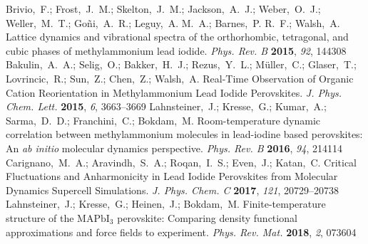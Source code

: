 \documentclass[journal=jpccck,manuscript=article,layout=twocolumn]{achemso}
\begin{document}
\begin{mcitethebibliography}{62}
Brivio,~F.; Frost,~J.~M.; Skelton,~J.~M.; Jackson,~A.~J.; Weber,~O.~J.;
  Weller,~M.~T.; Go\~ni,~A.~R.; Leguy,~A. M.~A.; Barnes,~P. R.~F.; Walsh,~A.
  Lattice dynamics and vibrational spectra of the orthorhombic, tetragonal, and
  cubic phases of methylammonium lead iodide. \emph{Phys. Rev. B}
  \textbf{2015}, \emph{92}, 144308\relax
\mciteBstWouldAddEndPuncttrue
\mciteSetBstMidEndSepPunct{\mcitedefaultmidpunct}
{\mcitedefaultendpunct}{\mcitedefaultseppunct}\relax
\EndOfBibitem
{}
Bakulin,~A.~A.; Selig,~O.; Bakker,~H.~J.; Rezus,~Y.~L.; Müller,~C.;
  Glaser,~T.; Lovrincic,~R.; Sun,~Z.; Chen,~Z.; Walsh,~A. 
  Real-Time Observation of Organic Cation Reorientation in Methylammonium Lead
  Iodide Perovskites. \emph{J. Phys. Chem. Lett.} \textbf{2015}, \emph{6},
  3663--3669\relax
\mciteBstWouldAddEndPuncttrue
\mciteSetBstMidEndSepPunct{\mcitedefaultmidpunct}
{\mcitedefaultendpunct}{\mcitedefaultseppunct}\relax
\EndOfBibitem
{}
Lahnsteiner,~J.; Kresse,~G.; Kumar,~A.; Sarma,~D.~D.; Franchini,~C.; Bokdam,~M.
  Room-temperature dynamic correlation between methylammonium molecules in
  lead-iodine based perovskites: An \textit{ab initio} molecular dynamics
  perspective. \emph{Phys. Rev. B} \textbf{2016}, \emph{94}, 214114\relax
\mciteBstWouldAddEndPuncttrue
\mciteSetBstMidEndSepPunct{\mcitedefaultmidpunct}
{\mcitedefaultendpunct}{\mcitedefaultseppunct}\relax
\EndOfBibitem
{}
Carignano,~M.~A.; Aravindh,~S.~A.; Roqan,~I.~S.; Even,~J.; Katan,~C. Critical
  Fluctuations and Anharmonicity in Lead Iodide Perovskites from Molecular
  Dynamics Supercell Simulations. \emph{J. Phys. Chem. C} \textbf{2017},
  \emph{121}, 20729--20738\relax
\mciteBstWouldAddEndPuncttrue
\mciteSetBstMidEndSepPunct{\mcitedefaultmidpunct}
{\mcitedefaultendpunct}{\mcitedefaultseppunct}\relax
\EndOfBibitem
{}
Lahnsteiner,~J.; Kresse,~G.; Heinen,~J.; Bokdam,~M. Finite-temperature
  structure of the ${\mathrm{MAPbI}}_{3}$ perovskite: Comparing density
  functional approximations and force fields to experiment. \emph{Phys. Rev.
  Mat.} \textbf{2018}, \emph{2}, 073604\relax
\mciteBstWouldAddEndPuncttrue
\mciteSetBstMidEndSepPunct{\mcitedefaultmidpunct}

\end{mcitethebibliography}
\end{document}
